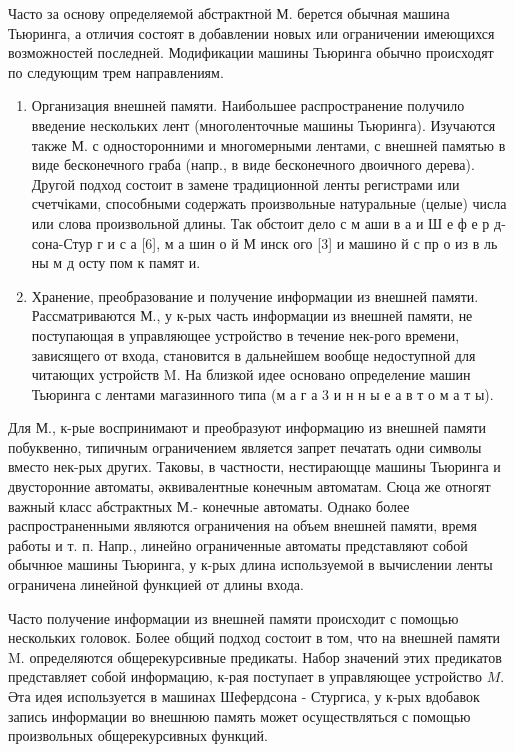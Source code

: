\documentclass[10pt]{article}
\begin{document}
Часто за основу определяемой абстрактной М. берется обычная машина Тьюринга, а отличия состоят в добавлении новых или ограничении имеющихся возможностей последней. Модификации машины Тьюринга обычно происходят по следующим трем направлениям.



\begin{enumerate}

  \item Организация внешней памяти. Наибольшее распространение получило введение нескольких лент (многоленточные машины Тьюринга). Изучаются также М. с односторонними и многомерными лентами, с внешней памятью в виде бесконечного граба (напр., в виде бесконечного двоичного дерева). Другой подход состоит в замене традиционной ленты регистрами или счетчіками, способными содержать произвольные натуральные (целые) числа или слова произвольной длины. Так обстоит дело с м аши в а и Ш е ф е р д- сона-Стур г и с а [6], м а шин о й М инск ого [3] и машино й с пр о из в ль ны м д осту пом к памят и.



  \item Хранение, преобразование и получение информации из внешней памяти. Рассматриваются М., у к-рых часть информации из внешней памяти, не поступающая в управляющее устройство в течение нек-рого времени, зависящего от входа, становится в дальнейшем вообще недоступной для читающих устройств $\mathrm{M}$. На близкой идее основано определение машин Тьюринга с лентами магазинного типа (м а г а 3 и н н ы е а в т о м а т ы).



\end{enumerate}



Для М., к-рые воспринимают и преобразуют информацию из внешней памяти побуквенно, типичным ограничением является запрет печатать одни символы вместо нек-рых других. Таковы, в частности, нестирающце машины Тьюринга и двусторонние автоматы, әквивалентные конечным автоматам. Сюца же отногят важный класс абстрактных М.- конечные автоматы. Однако более распространенными являются ограничения на объем внешней памяти, время работы и т. п. Напр., линейно ограниченные автоматы представляют собой обычнюе машины Тьюринга, у к-рых длина используемой в вычислении ленты ограничена линейной функцией от длины входа.



Часто получение информации из внешней памяти происходит с помощью нескольких головок. Более общий подход состоит в том, что на внешней памяти $\mathrm{M}$. определяются общерекурсивные предикаты. Набор значений этих предикатов представляет собой информацию, к-рая поступает в управляющее устройство $M$. Әта идея используется в машинах Шефердсона - Стургиса, у к-рых вдобавок запись информации во внешнюю память может осуществляться с помощью произвольных общерекурсивных функций.
\end{document}
